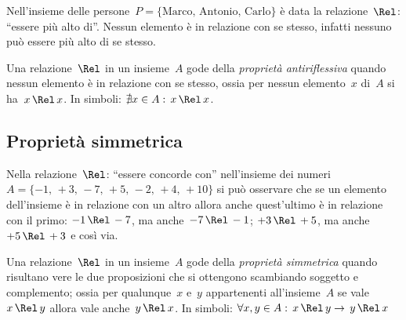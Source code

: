 \begin{exrig}
 \begin{esempio}
Nell'insieme delle persone~$P = \{\text{Marco, Antonio, Carlo}\}$ è data la relazione~$\Rel$: ``essere più alto di''. Nessun elemento è in relazione con se stesso, infatti nessuno può essere più alto di se stesso.
 \end{esempio}
\end{exrig}

\begin{definizione}
Una relazione~$\Rel$ in un insieme~$A$ gode della \emph{proprietà antiriflessiva} quando nessun elemento è in relazione con se stesso,
ossia per nessun elemento~$x$ di~$A$ si ha~$x \,\Rel\, x$.
In simboli: $\nexists x \in A:\, x \,\Rel\, x$.
\end{definizione}

\ovalbox{\risolvi \ref{ese:7.19}}
\subsection{Proprietà simmetrica}

\begin{exrig}
 \begin{esempio}
Nella relazione~$\Rel$: ``essere concorde con'' nell'insieme dei numeri~$A = \{-1\text{, }+3\text{, }-7\text{, }+5\text{, }-2\text{, }+4\text{, }+10\}$ si può osservare che se un elemento dell'insieme è in relazione con un altro allora anche quest'ultimo è in relazione con il primo:
$-1 \,\Rel\, -7$, ma anche~$-7 \,\Rel\, -1$; $+3 \,\Rel\, +5$, ma anche~$+5 \,\Rel\, +3$ e così via.
 \end{esempio}
\end{exrig}

% 
% 

\begin{definizione}
Una relazione~$\Rel$ in un insieme~$A$ gode della \emph{proprietà simmetrica} quando risultano vere le due proposizioni
che si ottengono scambiando soggetto e complemento; ossia per qualunque~$x$ e~$y$ appartenenti all'insieme~$A$ se vale~$x \,\Rel\, y$ allora vale anche~$y \,\Rel\, x$.
In simboli: $\forall x, y \in A:\, x \,\Rel\, y \rightarrow \, y \,\Rel\, x$
\end{definizione}

